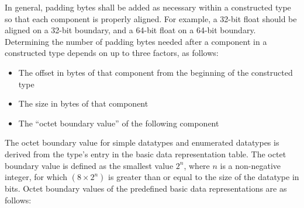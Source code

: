 In general, padding bytes shall be added as necessary within a constructed type so that each component is properly aligned. For example, a 32-bit float should be aligned on a 32-bit boundary, and a 64-bit float on a 64-bit boundary. Determining the number of padding bytes needed after a component in a constructed type depends on up to three factors, as follows:
\begin{itemize}
    \item The offset in bytes of that component from the beginning of the constructed type
\end{itemize}

\newpage
\begin{itemize}
    \item The size in bytes of that component
    \item The ``octet boundary value'' of the following component
\end{itemize}

The octet boundary value for simple datatypes and enumerated datatypes is derived from the type's entry in the basic data representation table. The octet boundary value is defined as the smallest value $2^n$, where $n$ is a non-negative integer, for which $(8 \times 2^n)$ is greater than or equal to the size of the datatype in bits. Octet boundary values of the predefined basic data representations are as follows:

